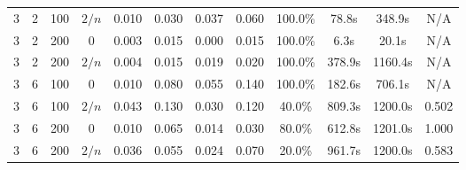 \begin{table}[h]
\begin{tabular}{cccc|cc|cc|cccc}
3 & 2 & 100 & $2/n$ & 0.010 & 0.030 & 0.037 & 0.060 & 100.0\% & 78.8s & 348.9s & N/A \\
3 & 2 & 200 & $0$ & 0.003 & 0.015 & 0.000 & 0.015 & 100.0\% & 6.3s & 20.1s & N/A \\
3 & 2 & 200 & $2/n$ & 0.004 & 0.015 & 0.019 & 0.020 & 100.0\% & 378.9s & 1160.4s & N/A \\
3 & 6 & 100 & $0$ & 0.010 & 0.080 & 0.055 & 0.140 & 100.0\% & 182.6s & 706.1s & N/A \\
3 & 6 & 100 & $2/n$ & 0.043 & 0.130 & 0.030 & 0.120 & 40.0\% & 809.3s & 1200.0s & 0.502 \\
3 & 6 & 200 & $0$ & 0.010 & 0.065 & 0.014 & 0.030 & 80.0\% & 612.8s & 1201.0s & 1.000 \\
3 & 6 & 200 & $2/n$ & 0.036 & 0.055 & 0.024 & 0.070 & 20.0\% & 961.7s & 1200.0s & 0.583 \\
\hline
\end{tabular}
\end{table}
